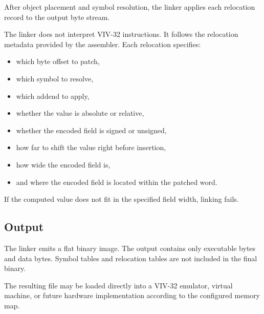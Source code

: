 After object placement and symbol resolution, the linker applies each relocation record
to the output byte stream.

The linker does not interpret VIV-32 instructions. It follows the relocation metadata
provided by the assembler. Each relocation specifies:

\begin{itemize}
    \item which byte offset to patch,
    \item which symbol to resolve,
    \item which addend to apply,
    \item whether the value is absolute or relative,
    \item whether the encoded field is signed or unsigned,
    \item how far to shift the value right before insertion,
    \item how wide the encoded field is,
    \item and where the encoded field is located within the patched word.
\end{itemize}

If the computed value does not fit in the specified field width, linking fails.

\subsection{Output}

The linker emits a flat binary image. The output contains only executable bytes and
data bytes. Symbol tables and relocation tables are not included in the final binary.

The resulting file may be loaded directly into a VIV-32 emulator, virtual machine, or
future hardware implementation according to the configured memory map.

